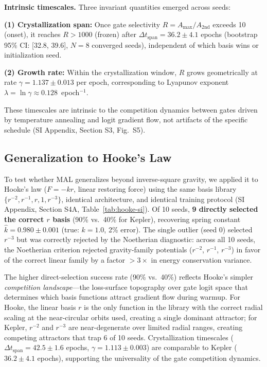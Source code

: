 \documentclass[9pt,twocolumn,twoside]{pnas-new}
\begin{document}
\textbf{Intrinsic timescales.} Three invariant quantities emerged across seeds:

\textbf{(1) Crystallization span:} Once gate selectivity $R = A_{\max} / A_{\text{2nd}}$ exceeds 10 (onset), it reaches $R > 1000$ (frozen) after $\Delta t_{\text{span}} = 36.2 \pm 4.1$ epochs (bootstrap 95\% CI: [32.8, 39.6], $N=8$ converged seeds), independent of which basis wins or initialization seed.

\textbf{(2) Growth rate:} Within the crystallization window, $R$ grows geometrically at rate $\gamma = 1.137 \pm 0.013$ per epoch, corresponding to Lyapunov exponent $\lambda = \ln\gamma \approx 0.128$~epoch$^{-1}$.

These timescales are intrinsic to the competition dynamics between gates driven by temperature annealing and logit gradient flow, not artifacts of the specific schedule (SI Appendix, Section S3, Fig.~S5).

\subsection*{Generalization to Hooke's Law}
To test whether MAL generalizes beyond inverse-square gravity, we applied it to Hooke's law ($F = -kr$, linear restoring force) using the same basis library $\{r^{-2}, r^{-1}, r, 1, r^{-3}\}$, identical architecture, and identical training protocol (SI Appendix, Section S4A, Table~\ref{tab:hooke-si}). Of 10 seeds, \textbf{9 directly selected the correct $r$ basis} (90\% vs.\ 40\% for Kepler), recovering spring constant $\hat{k} = 0.980 \pm 0.001$ (true: $k = 1.0$, 2\% error). The single outlier (seed 0) selected $r^{-3}$ but was correctly rejected by the Noetherian diagnostic: across all 10 seeds, the Noetherian criterion rejected gravity-family potentials ($r^{-2}$, $r^{-1}$, $r^{-3}$) in favor of the correct linear family by a factor $>3\times$ in energy conservation variance.

The higher direct-selection success rate (90\% vs.\ 40\%) reflects Hooke's simpler \textit{competition landscape}---the loss-surface topography over gate logit space that determines which basis functions attract gradient flow during warmup. For Hooke, the linear basis $r$ is the only function in the library with the correct radial scaling at the near-circular orbits used, creating a single dominant attractor; for Kepler, $r^{-2}$ and $r^{-3}$ are near-degenerate over limited radial ranges, creating competing attractors that trap 6 of 10 seeds. Crystallization timescales ($\Delta t_{\text{span}} = 42.5 \pm 1.6$ epochs, $\gamma = 1.113 \pm 0.003$) are comparable to Kepler ($36.2 \pm 4.1$ epochs), supporting the universality of the gate competition dynamics.
\end{document}
